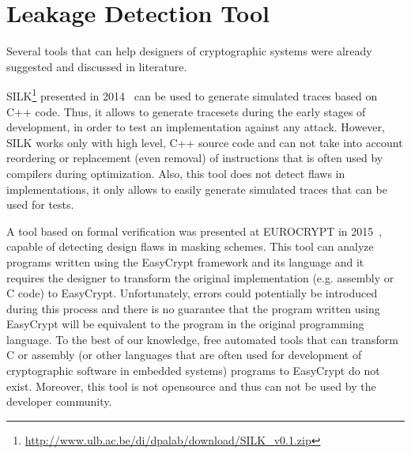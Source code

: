 \section{Leakage Detection Tool}\label{sec:tool}


Several tools that can help designers of cryptographic systems
were already suggested and discussed in literature.


SILK\footnote{\url{http://www.ulb.ac.be/di/dpalab/download/SILK_v0.1.zip}} 
presented in 2014~\cite{DBLP:conf/acsac/Veshchikov14}
can be used to generate simulated traces based on C++ code. Thus, it allows
to generate tracesets during the early stages of development, in order to test an implementation
against any attack. However, SILK works only with high level, C++ source code and 
can not take into account reordering or replacement (even removal) 
of instructions that is often used by compilers during
optimization. Also, this tool does not detect flaws in implementations, 
it only allows to easily generate simulated traces that can be used for tests.

A tool based on formal verification 
was presented at EUROCRYPT in 2015~\cite{DBLP:conf/eurocrypt/BartheBDFGS15},
capable of detecting design flaws in masking schemes.
This tool can analyze programs written using the EasyCrypt framework and its language and
it requires the designer to transform the original implementation (e.g. assembly or C code)
to EasyCrypt. Unfortunately, errors could potentially be introduced during this process
and there is no guarantee that the program written using EasyCrypt will be equivalent
to the program in the original programming language. To the best of our knowledge, 
free automated tools that can transform C or assembly 
(or other languages that are often used for development of cryptographic software in embedded systems) 
programs to EasyCrypt do not exist.
Moreover, this tool is not opensource and thus can not be used by the developer community.

